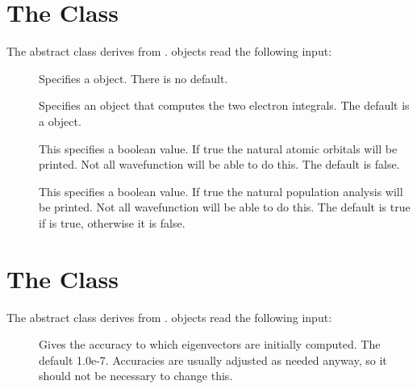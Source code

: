 

\section{The  Class}
\label{Wavefunction}

The  abstract class derives from
.   objects read the
following input:

\begin{description}
  \item[] Specifies a  object.
    There is no default.

  \item[] Specifies an  object that
    computes the two electron integrals.  The default is a
     object.

  \item[] This specifies a boolean value.  If true
    the natural atomic orbitals will be printed.  Not all wavefunction
    will be able to do this.  The default is false.

  \item[] This specifies a boolean value.  If true the
    natural population analysis will be printed.  Not all wavefunction will
    be able to do this.  The default is true if  is
    true, otherwise it is false.

\end{description}


\section{The  Class}
\label{OneBodyWavefunction}

The  abstract class derives from
.   objects read the
following input:

\begin{description}
  \item[] Gives the accuracy to which
    eigenvectors are initially computed.  The default 1.0e-7.  Accuracies
    are usually adjusted as needed anyway, so it should not be necessary to
    change this.

\end{description}
